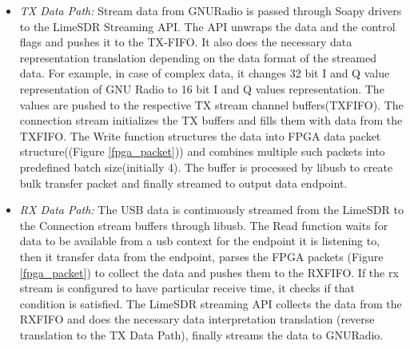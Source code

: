 \begin{itemize}
\item{\textit{TX Data Path:} Stream data from GNURadio is passed through Soapy drivers to the LimeSDR Streaming API. The API unwraps the data and the control flags and pushes it to the TX-FIFO. It also does the necessary data representation translation depending on the data format of the streamed data. For example, in case of complex data, it changes 32 bit I and Q value representation of GNU Radio to 16 bit I and Q values representation.  The values are pushed to the respective TX stream channel buffers(TXFIFO). The connection stream initializes the TX buffers and fills them with data from the TXFIFO. The Write function structures the data into FPGA data packet structure((Figure \ref{fpga_packet})) and combines multiple such packets into predefined batch size(initially 4). The buffer is processed by libusb to create bulk transfer packet and finally streamed to output data endpoint.}

\item{\textit{RX Data Path: } The USB data is continuously streamed from the LimeSDR to the Connection stream buffers through libusb. The Read function waits for data to be available from a usb context for the endpoint it is listening to, then it transfer data from the endpoint, parses the FPGA packets (Figure \ref{fpga_packet}) to collect the data and pushes them to the RXFIFO. If the rx stream is configured to have particular receive time, it checks if that condition is satisfied. The LimeSDR streaming API collects the data from the RXFIFO and does the necessary data interpretation translation (reverse translation to the TX Data Path), finally streams the data to GNURadio. }
\end{itemize}

